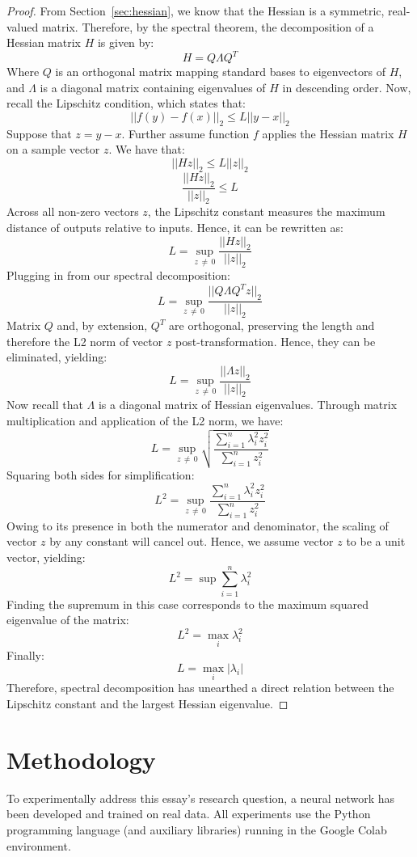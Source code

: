 \documentclass{article}
\theoremstyle{definition}
\begin{document}
\begin{proof}
    From Section~\ref{sec:hessian}, we know that the Hessian is a symmetric, real-valued matrix. Therefore, by the spectral theorem, the decomposition of a Hessian matrix $H$ is given by:
    \begin{equation}
        H = Q\Lambda Q^T
    \end{equation}
    Where $Q$ is an orthogonal matrix mapping standard bases to eigenvectors of $H$, and $\Lambda$ is a diagonal matrix containing eigenvalues of $H$ in descending order.
    Now, recall the Lipschitz condition, which states that:
    \[
        ||f(y) - f(x)||_2 \leq L ||y-x||_2 
    \]
    Suppose that $z = y-x$. Further assume function $f$ applies the Hessian matrix $H$ on a sample vector $z$. We have that:
    \[
        ||Hz||_2 \leq L ||z||_2 
    \]
    \[
        \frac{||Hz||_2}{||z||_2} \leq L
    \]
    Across all non-zero vectors $z$, the Lipschitz constant measures the maximum distance of outputs relative to inputs. Hence, it can be rewritten as:
    \[
        L = \sup_{z \, \neq \, 0} \frac{||Hz||_2}{||z||_2}
    \]
    Plugging in from our spectral decomposition:
    \[
        L = \sup_{z \, \neq \, 0} \frac{||Q \Lambda Q^T z||_2}{||z||_2}
    \]
    Matrix $Q$ and, by extension, $Q^T$ are orthogonal, preserving the length and therefore the L2 norm of vector $z$ post-transformation. Hence, they can be eliminated, yielding:
    \[
        L = \sup_{z \, \neq \, 0} \frac{||\Lambda z||_2}{||z||_2}
    \]
    Now recall that $\Lambda$ is a diagonal matrix of Hessian eigenvalues. Through matrix multiplication and application of the L2 norm, we have:
    \[
        L = \sup_{z \, \neq \, 0} \sqrt{\frac{\sum_{i=1}^n \lambda_i^2 z_i^2}{\sum_{i=1}^n z_i^2}}
    \]
    Squaring both sides for simplification:
    \[
        L^2 = \sup_{z \, \neq \, 0}\frac{\sum_{i=1}^n \lambda_i^2 z_i^2}{\sum_{i=1}^n z_i^2}
    \]
    Owing to its presence in both the numerator and denominator, the scaling of vector $z$ by any constant will cancel out. Hence, we assume vector $z$ to be a unit vector, yielding:
    \[
        L^2 = \sup\sum_{i=1}^n \lambda_i^2
    \]
    Finding the supremum in this case corresponds to the maximum squared eigenvalue of the matrix:
    \[
        L^2 = \max_i \lambda_i^2
    \]
    Finally:
    \[
        L = \max_i |\lambda_i|
    \]
    Therefore, spectral decomposition has unearthed a direct relation between the Lipschitz constant and the largest Hessian eigenvalue.
\end{proof}
\section{Methodology}
To experimentally address this essay's research question, a neural network has been developed and trained on real data. All experiments use the Python programming language (and auxiliary libraries) running in the Google Colab environment.
\end{document}
